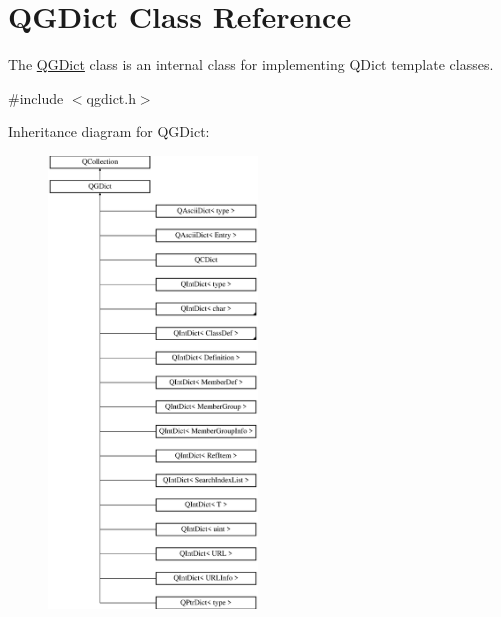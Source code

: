 \hypertarget{class_q_g_dict}{}\section{Q\+G\+Dict Class Reference}
\label{class_q_g_dict}


The \mbox{\hyperlink{class_q_g_dict}{Q\+G\+Dict}} class is an internal class for implementing Q\+Dict template classes.  




{\ttfamily \#include $<$qgdict.\+h$>$}

Inheritance diagram for Q\+G\+Dict\+:\begin{figure}[H]
\begin{center}
\leavevmode
\includegraphics[height=12.000000cm]{class_q_g_dict}
\end{center}
\end{figure}
